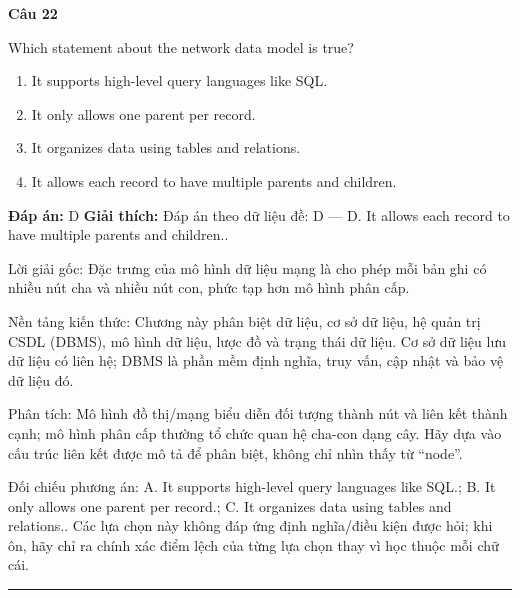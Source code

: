 \documentclass[11pt,a4paper]{article}
\newenvironment{question}[1]{%
  \par\vspace{1em}\noindent\textbf{\large Câu #1}\par\vspace{0.4em}
}{%
  \par\vspace{1em}\hrule\vspace{0.6em}
}
\newenvironment{choices}{%
  \begin{enumerate}[label=\textbf{\Alph*.},leftmargin=2.2em,itemsep=2pt,topsep=3pt]
}{%
  \end{enumerate}
}
\newcommand{\choice}{\item}
\begin{document}
\begin{question}{22}
Which statement about the network data model is true?
\begin{choices}
\choice It supports high-level query languages like SQL.
\choice It only allows one parent per record.
\choice It organizes data using tables and relations.
\choice It allows each record to have multiple parents and children.
\end{choices}
\textbf{Đáp án:} D
\textbf{Giải thích:} Đáp án theo dữ liệu đề: D — D. It allows each record to have multiple parents and children..

Lời giải gốc: Đặc trưng của mô hình dữ liệu mạng là cho phép mỗi bản ghi có nhiều nút cha và nhiều nút con, phức tạp hơn mô hình phân cấp.

Nền tảng kiến thức: Chương này phân biệt dữ liệu, cơ sở dữ liệu, hệ quản trị CSDL (DBMS), mô hình dữ liệu, lược đồ và trạng thái dữ liệu. Cơ sở dữ liệu lưu dữ liệu có liên hệ; DBMS là phần mềm định nghĩa, truy vấn, cập nhật và bảo vệ dữ liệu đó.

Phân tích: Mô hình đồ thị/mạng biểu diễn đối tượng thành nút và liên kết thành cạnh; mô hình phân cấp thường tổ chức quan hệ cha-con dạng cây. Hãy dựa vào cấu trúc liên kết được mô tả để phân biệt, không chỉ nhìn thấy từ “node”.

Đối chiếu phương án: A. It supports high-level query languages like SQL.; B. It only allows one parent per record.; C. It organizes data using tables and relations.. Các lựa chọn này không đáp ứng định nghĩa/điều kiện được hỏi; khi ôn, hãy chỉ ra chính xác điểm lệch của từng lựa chọn thay vì học thuộc mỗi chữ cái.
\end{question}
\end{document}
